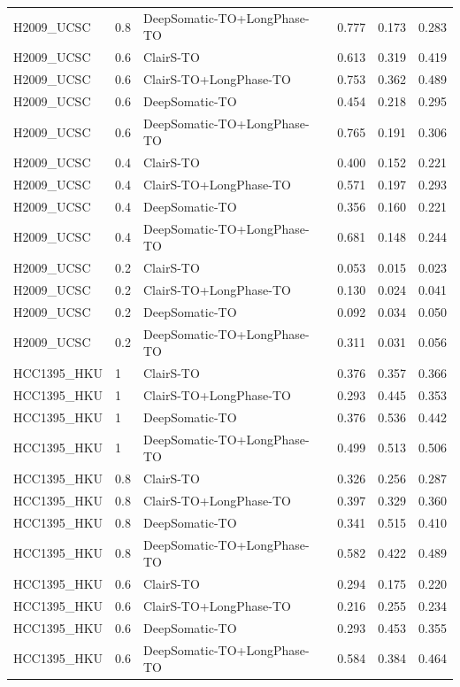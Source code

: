 \documentclass[pdflatex,sn-nature]{sn-jnl}
\begin{document}
{\begin{longtable}{@{}lllccc@{}}
  H2009\_UCSC & 0.8 & DeepSomatic-TO+LongPhase-TO & 0.777 & 0.173 & 0.283 \\
  H2009\_UCSC & 0.6 & ClairS-TO & 0.613 & 0.319 & 0.419 \\
  H2009\_UCSC & 0.6 & ClairS-TO+LongPhase-TO & 0.753 & 0.362 & 0.489 \\
  H2009\_UCSC & 0.6 & DeepSomatic-TO & 0.454 & 0.218 & 0.295 \\
  H2009\_UCSC & 0.6 & DeepSomatic-TO+LongPhase-TO & 0.765 & 0.191 & 0.306 \\
  H2009\_UCSC & 0.4 & ClairS-TO & 0.400 & 0.152 & 0.221 \\
  H2009\_UCSC & 0.4 & ClairS-TO+LongPhase-TO & 0.571 & 0.197 & 0.293 \\
  H2009\_UCSC & 0.4 & DeepSomatic-TO & 0.356 & 0.160 & 0.221 \\
  H2009\_UCSC & 0.4 & DeepSomatic-TO+LongPhase-TO & 0.681 & 0.148 & 0.244 \\
  H2009\_UCSC & 0.2 & ClairS-TO & 0.053 & 0.015 & 0.023 \\
  H2009\_UCSC & 0.2 & ClairS-TO+LongPhase-TO & 0.130 & 0.024 & 0.041 \\
  H2009\_UCSC & 0.2 & DeepSomatic-TO & 0.092 & 0.034 & 0.050 \\
  H2009\_UCSC & 0.2 & DeepSomatic-TO+LongPhase-TO & 0.311 & 0.031 & 0.056 \\
  HCC1395\_HKU & 1 & ClairS-TO & 0.376 & 0.357 & 0.366 \\
  HCC1395\_HKU & 1 & ClairS-TO+LongPhase-TO & 0.293 & 0.445 & 0.353 \\
  HCC1395\_HKU & 1 & DeepSomatic-TO & 0.376 & 0.536 & 0.442 \\
  HCC1395\_HKU & 1 & DeepSomatic-TO+LongPhase-TO & 0.499 & 0.513 & 0.506 \\
  HCC1395\_HKU & 0.8 & ClairS-TO & 0.326 & 0.256 & 0.287 \\
  HCC1395\_HKU & 0.8 & ClairS-TO+LongPhase-TO & 0.397 & 0.329 & 0.360 \\
  HCC1395\_HKU & 0.8 & DeepSomatic-TO & 0.341 & 0.515 & 0.410 \\
  HCC1395\_HKU & 0.8 & DeepSomatic-TO+LongPhase-TO & 0.582 & 0.422 & 0.489 \\
  HCC1395\_HKU & 0.6 & ClairS-TO & 0.294 & 0.175 & 0.220 \\
  HCC1395\_HKU & 0.6 & ClairS-TO+LongPhase-TO & 0.216 & 0.255 & 0.234 \\
  HCC1395\_HKU & 0.6 & DeepSomatic-TO & 0.293 & 0.453 & 0.355 \\
  HCC1395\_HKU & 0.6 & DeepSomatic-TO+LongPhase-TO & 0.584 & 0.384 & 0.464 \\

\end{longtable}}
\end{document}
